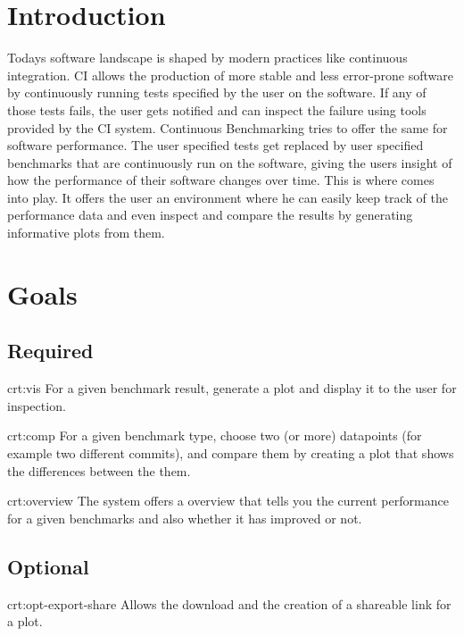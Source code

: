 \section{Introduction}

Todays software landscape is shaped by modern practices like continuous integration. CI allows the production of more stable and less error-prone software by continuously running tests specified by the user on the software. If any of those tests fails, the user gets notified and can inspect the failure using tools provided by the CI system. Continuous Benchmarking tries to offer the same for software performance. The user specified tests get replaced by user specified benchmarks that are continuously run on the software, giving the users insight of how the performance of their software changes over time. This is where \parkview{} comes into play. It offers the user an environment where he can easily keep track of the performance data and even inspect and compare the results by generating informative plots from them.

\section{Goals}

\subsection{Required}

{crt:vis}
{For a given benchmark result, generate a \gls{plot} and display it to the user for inspection.}

{crt:comp}
{For a given benchmark type, choose two (or more) datapoints (for example two different commits), and compare them by creating a plot that shows the differences between the them.}

{crt:overview}
{The system offers a overview that tells you the current performance for a given benchmarks and also whether it has improved or not.}

\subsection{Optional}

{crt:opt-export-share}
{Allows the download and the creation of a shareable link for a \gls{plot}.}

